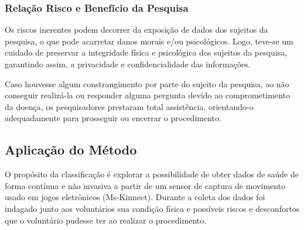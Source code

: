 

\subsubsection{Relação Risco e Benefício da Pesquisa}
Os riscos inerentes podem decorrer da exposição de dados dos sujeitos da pesquisa, o que pode acarretar danos morais e/ou psicológicos. Logo, teve-se um cuidado de preservar a integridade física e psicológica dos sujeitos da pesquisa, garantindo assim, a privacidade e confidencialidade das informações.

Caso houvesse algum constrangimento por parte do sujeito da pesquisa, ao não conseguir realizá-la ou responder alguma pergunta devido ao comprometimento da doença, os pesquisadores prestaram total assistência, orientando-o adequadamente para prosseguir ou encerrar o procedimento.





\subsection{Aplicação do Método}
O propósito da classificação é explorar a possibilidade de obter dados de saúde de forma contínua e não invasiva a partir de um sensor de captura de movimento usado em jogos eletrônicos (Ms-Kinnect). Durante a coleta dos dados foi indagado junto aos voluntários sua condição física e possíveis riscos e desconfortos que o voluntário pudesse ter ao realizar o procedimento. 

